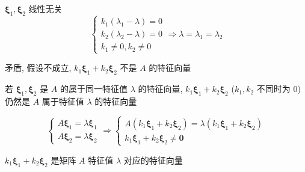 \begin{corollary}[特征向量]
\begin{anymark}[证明]
		$\boldsymbol{\xi}_{1}, \boldsymbol{\xi}_{2}$ 线性无关
		$$\begin{cases}
			k_{1}(\lambda_{1} - \lambda) = 0\\
			k_{2}(\lambda_{2} - \lambda) = 0\\
			k_{1} \neq 0, k_{2} \neq 0
		\end{cases}\Rightarrow 
		\lambda = \lambda_{1} = \lambda_{2}$$

		矛盾, 假设不成立, $k_{1}\boldsymbol{\xi}_{1} + k_{2}\boldsymbol{\xi}_{2}$ 不是 $A$ 的特征向量
	\end{anymark}

	\begin{proposition}
		若 $\boldsymbol{\xi}_{1},\boldsymbol{\xi}_{2}$ 是 $A$ 的属于同一特征值 $\lambda$ 的特征向量, 
		$k_{1}\boldsymbol{\xi}_{1} + k_{2}\boldsymbol{\xi}_{2}$ ($k_{1},k_{2}$ 不同时为 $0$) 仍然是 $A$ 属于特征值 $\lambda$ 的特征向量
	\end{proposition}
	\begin{anymark}[证明]
		$$\begin{cases}
			A\boldsymbol{\xi}_{1} = \lambda \boldsymbol{\xi}_{1}\\
			A\boldsymbol{\xi}_{2} = \lambda \boldsymbol{\xi}_{2}
		\end{cases}\Rightarrow
		\begin{cases}
			A(k_{1}\boldsymbol{\xi}_{1} + k_{2}\boldsymbol{\xi}_{2}) = \lambda(k_{1}\boldsymbol{\xi}_{1} + k_{2}\boldsymbol{\xi}_{2})\\
			k_{1}\boldsymbol{\xi}_{1} + k_{2}\boldsymbol{\xi}_{2} \neq \boldsymbol{0}
		\end{cases}$$

		$k_{1}\boldsymbol{\xi}_{1} + k_{2}\boldsymbol{\xi}_{2}$ 是矩阵 $A$ 特征值 $\lambda$ 对应的特征向量
	\end{anymark}
\end{corollary}

